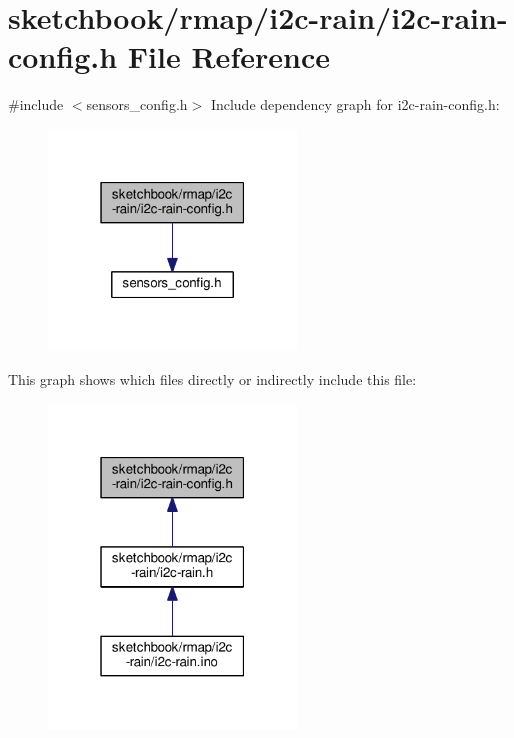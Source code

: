 \hypertarget{i2c-rain-config_8h}{}\section{sketchbook/rmap/i2c-\/rain/i2c-\/rain-\/config.h File Reference}
\label{i2c-rain-config_8h}
{\ttfamily \#include $<$sensors\+\_\+config.\+h$>$}\newline
Include dependency graph for i2c-\/rain-\/config.h\+:
\nopagebreak
\begin{figure}[H]
\begin{center}
\leavevmode
\includegraphics[width=187pt]{i2c-rain-config_8h__incl}
\end{center}
\end{figure}
This graph shows which files directly or indirectly include this file\+:
\nopagebreak
\begin{figure}[H]
\begin{center}
\leavevmode
\includegraphics[width=187pt]{i2c-rain-config_8h__dep__incl}
\end{center}
\end{figure}
